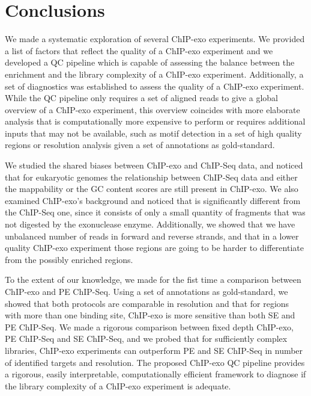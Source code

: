 \documentclass{bmcart}\usepackage[]{graphicx}\usepackage[]{color}
\begin{document}
% 

\section{Conclusions}
\label{sec:conc}

We made a systematic exploration of several ChIP-exo experiments. We
provided a list of factors that reflect the quality of a ChIP-exo
experiment and we developed a QC pipeline which is capable of
assessing the balance between the enrichment and the library
complexity of a ChIP-exo experiment. Additionally, a set of
diagnostics was established to assess the quality of a ChIP-exo
experiment. While the QC pipeline only requires a set of aligned reads
to give a global overview of a ChIP-exo experiment, this overview
coincides with more elaborate analysis that is computationally more
expensive to perform or requires additional inputs that may not be
available, such as motif detection in a set of high quality regions or
resolution analysis given a set of annotations as gold-standard.

We studied the shared biases between ChIP-exo and ChIP-Seq data, and
noticed that for eukaryotic genomes the relationship between ChIP-Seq
data and either the mappability or the GC content scores are still
present in ChIP-exo. We also examined ChIP-exo's background and
noticed that is significantly different from the ChIP-Seq one, since
it consists of only a small quantity of fragments that was not
digested by the exonuclease enzyme. Additionally, we showed that we
have unbalanced number of reads in forward and reverse strands, and
that in a lower quality ChIP-exo experiment those regions are going to
be harder to differentiate from the possibly enriched regions.

To the extent of our knowledge, we made for the fist time a comparison
between ChIP-exo and PE ChIP-Seq. Using a set of annotations as
gold-standard, we showed that both protocols are comparable in
resolution and that for regions with more than one binding site,
ChIP-exo is more sensitive than both SE and PE ChIP-Seq. We made a
rigorous comparison between fixed depth ChIP-exo, PE ChIP-Seq and SE
ChIP-Seq, and we probed that for sufficiently complex libraries,
ChIP-exo experiments can outperform PE and SE ChIP-Seq in number of
identified targets and resolution. The proposed ChIP-exo QC pipeline
provides a rigorous, easily interpretable, computationally efficient
framework to diagnose if the library complexity of a ChIP-exo
experiment is adequate.
\end{document}
